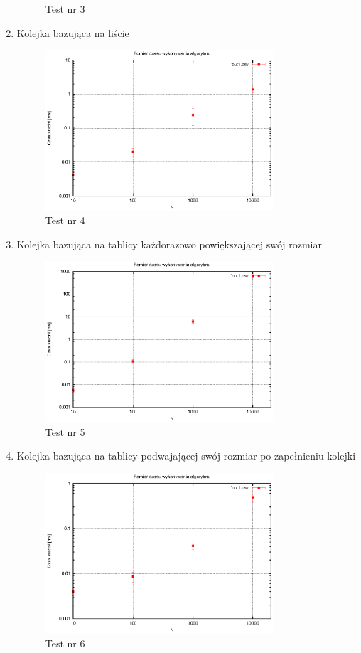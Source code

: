\documentclass[a4paper,11pt]{article}
\begin{document}
\begin{enumerate}
\begin{figure}[!ht]
\caption{Test nr 3}
\label{Test nr 3}
\end{figure} 
\newpage
\item Kolejka bazująca na liście
\begin{figure}[!ht]
\centering
\includegraphics[width=0.8\textwidth]{wykres4.eps}
\caption{Test nr 4}
\label{Test nr 4}
\end{figure} 
\item Kolejka bazująca na tablicy każdorazowo powiększającej swój rozmiar
\begin{figure}[!ht]
\centering
\includegraphics[width=0.8\textwidth]{wykres5.eps}
\caption{Test nr 5}
\label{Test nr 5}
\end{figure} 
\newpage
\item Kolejka bazująca na tablicy podwajającej swój rozmiar po zapełnieniu kolejki
\begin{figure}[!ht]
\centering
\includegraphics[width=0.8\textwidth]{wykres6.eps}
\caption{Test nr 6}
\label{Test nr 6}
\end{figure} 
\end{enumerate}
\end{document}
